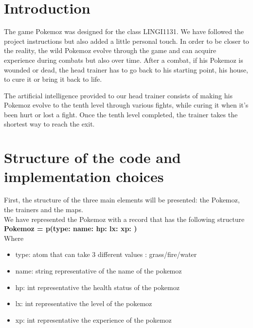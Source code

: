 \documentclass[a4paper,10pt]{article}
\begin{document}
\section*{Introduction}

The game Pokemoz was designed for the class LINGI1131. We have followed the project instructions but also added a little personal touch. 
In order to be closer to the reality, the wild Pokemoz evolve through the game and can acquire experience during combats but also over time.
After a combat, if his Pokemoz is wounded or dead, the head trainer has to go back to his starting point, his house, to cure it or bring it back to life. 

The artificial intelligence provided to our head trainer consists of making his Pokemoz evolve to the tenth level through various fights, while curing it when it’s been hurt or lost a fight. 
Once the tenth level completed, the trainer takes the shortest way to reach the exit.

\section*{Structure of the code and implementation choices}

First, the structure of the three main elements will be presented: the Pokemoz, the trainers and the maps.\\

We have represented the Pokemoz with a record that has the following structure \\
\textbf{Pokemoz = p(type: name:  hp:  lx: xp: )} \\
Where
\begin{itemize}
\item type:  atom that can take 3 different values : grass/fire/water 
\item    name: string representative of the name of the pokemoz
\item    hp: int representative the health status of the pokemoz
\item    lx: int representative the level of the pokemoz
\item    xp: int representative the experience of the pokemoz \\ 

\end{itemize}    
\end{document}
